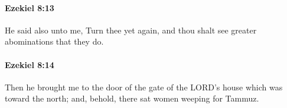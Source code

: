 		\paragraph{Ezekiel 8:13} %
			\label{EZEKIEL-8-13}

			He said also unto me, Turn thee yet again, and thou shalt see greater abominations that they do.


		\paragraph{Ezekiel 8:14} %
			\label{EZEKIEL-8-14}

			Then he brought me to the door of the gate of the LORD’s house which was toward the north; and, behold, there sat women weeping for Tammuz.


